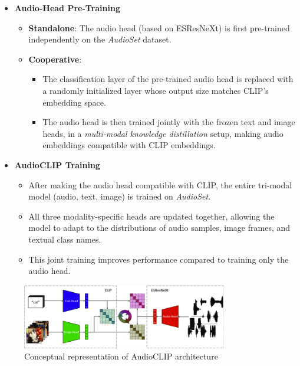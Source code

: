 \begin{itemize}
    \item \textbf{Audio-Head Pre-Training}  
    \begin{itemize}
        \item \textbf{Standalone}: The audio head (based on ESResNeXt) is first pre-trained independently on the \textit{AudioSet} dataset.  
        \item \textbf{Cooperative}:  
        \begin{itemize}
            \item The classification layer of the pre-trained audio head is replaced with a randomly initialized layer whose output size matches CLIP’s embedding space.  
            \item The audio head is then trained jointly with the frozen text and image heads, in a \textit{multi-modal knowledge distillation} setup, making audio embeddings compatible with CLIP embeddings.
        \end{itemize}
    \end{itemize}

    \item \textbf{AudioCLIP Training}  
    \begin{itemize}
        \item After making the audio head compatible with CLIP, the entire tri-modal model (audio, text, image) is trained on \textit{AudioSet}.  
        \item All three modality-specific heads are updated together, allowing the model to adapt to the distributions of audio samples, image frames, and textual class names.  
        \item This joint training improves performance compared to training only the audio head.
    \end{itemize}
\end{itemize}


\begin{figure}[H]
    \centering
    \includegraphics[width=0.8\textwidth]{img/AudioCLIP.png}
    \caption{Conceptual representation of AudioCLIP architecture}
\end{figure}